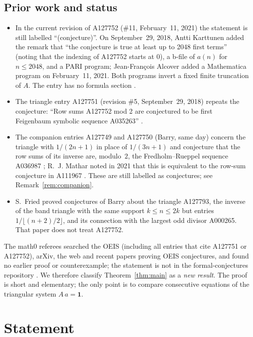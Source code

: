 \documentclass[11pt]{amsart}
\theoremstyle{plain}
\theoremstyle{definition}
\begin{document}
\subsection*{Prior work and status}
\begin{itemize}
\item In the current revision of A127752 (\#11, February~11, 2021) the statement is still labelled ``(conjecture)''. On September~29, 2018, Antti Karttunen added the remark that ``the conjecture is true at least up to 2048 first terms'' (noting that the indexing of A127752 starts at $0$), a b-file of $a(n)$ for $n\le2048$, and a PARI program; Jean-Fran\c{c}ois Alcover added a Mathematica program on February~11, 2021. Both programs invert a fixed finite truncation of $A$. The entry has no formula section \cite{A127752}.
\item The triangle entry A127751 (revision \#5, September~29, 2018) repeats the conjecture: ``Row sums A127752 mod 2 are conjectured to be first Feigenbaum symbolic sequence A035263'' \cite{A127751}.
\item The companion entries A127749 and A127750 (Barry, same day) concern the triangle with $1/(2n+1)$ in place of $1/(3n+1)$ and conjecture that the row sums of its inverse are, modulo~$2$, the Fredholm--Rueppel sequence A036987 \cite{A127749,A127750}; R.~J. Mathar noted in 2021 that this is equivalent to the row-sum conjecture in A111967 \cite{A127749,A111967}. These are still labelled as conjectures; see Remark~\ref{rem:companion}.
\item S.~Fried \cite{Fried} proved conjectures of Barry about the triangle A127793, the inverse of the band triangle with the same support $k\le n\le2k$ but entries $1/\lfloor(n+2)/2\rfloor$, and its connection with the largest odd divisor A000265. That paper does not treat A127752.
\end{itemize}
The math0 referees searched the OEIS (including all entries that cite A127751 or A127752), arXiv, the web and recent papers proving OEIS conjectures, and found no earlier proof or counterexample; the statement is not in the formal-conjectures repository \cite{FC}. We therefore classify Theorem~\ref{thm:main} as a \emph{new result}. The proof is short and elementary; the only point is to compare consecutive equations of the triangular system $A\,a=\mathbf1$.

\section{Statement}\label{sec:statement}
\end{document}
